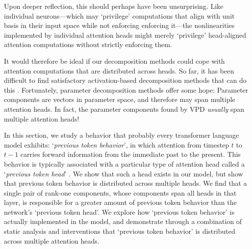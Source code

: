 \documentclass{article}
\begin{document}

Upon deeper reflection, this should perhaps have been unsurprising. Like individual neurons---which may `privilege' computations that align with unit basis in their input space while not enforcing enforcing it---the nonlinearities implemented by individual attention heads might merely `privilege' head-aligned attention computations without strictly enforcing them. 

It would therefore be ideal if our decomposition methods could cope with attention computations that are distributed across heads. So far, it has been difficult to find satisfactory activation-based decomposition methods that can do this \cite{jermyn2025attention}. Fortunately, parameter decomposition methods offer some hope: Parameter components are vectors in parameter space, and therefore may span multiple attention heads. In fact, the parameter components found by VPD \textit{usually} span multiple attention heads! 

In this section, we study a behavior that probably every transformer language model exhibits: `\textit{previous token behavior}', in which attention from timestep $t$ to $t-1$ carries forward information from the immediate past to the present. This behavior is typically associated with a particular type of attention head called a `\textit{previous token head}' \cite{clark-etal-2019-bert,elhage2021mathematical, olsson2022incontextlearninginductionheads, wang2022interpretability}. We show that such a head exists in our model, but show that previous token behavior is distributed across multiple heads. We find that a single pair of rank-one components, whose components span all heads in that layer, is responsible for a greater amount of previous token behavior than the network's `previous token head'. We explore how `previous token behavior' is actually implemented in the model, and demonstrate through a combination of static analysis and interventions that `previous token behavior' is distributed across multiple attention heads.
\end{document}

